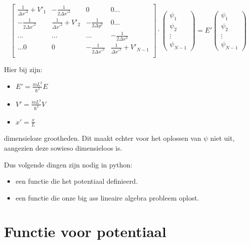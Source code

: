 \documentclass[11pt]{article}
\providecommand{\tightlist}{%
      \setlength{\itemsep}{0pt}\setlength{\parskip}{0pt}}
\begin{document}
\[
\begin{bmatrix}
\frac{1}{\Delta x'^2}+V'_1 & -\frac{1}{2 \Delta x'^2} &   0 & 0...\\
-\frac{1}{2 \Delta x'^2} & \frac{1}{\Delta x'^2}+V'_2 & -\frac{1}{2 \Delta y^2} & 0... \\
...& ... & ... & -\frac{1}{2 \Delta x^2}\\
...0 & 0 & -\frac{1}{2 \Delta x'^2} & \frac{1}{\Delta x'^2}+V'_{N-1}\\
\end{bmatrix} \cdot \begin{pmatrix}
\psi_1\\
\psi_2\\
\vdots\\
\psi_{N-1}
\end{pmatrix} = E' \begin{pmatrix}
\psi_1\\
\psi_2\\
\vdots\\
\psi_{N-1}
\end{pmatrix}
\]

Hier bij zijn:

\begin{itemize}
\tightlist
\item
  \(E' = \frac{m L^2}{\hbar^2} E\)
\item
  \(V' = \frac{m L^2}{\hbar^2} V\)
\item
  \(x' = \frac{x}{L}\)
\end{itemize}

dimensieloze grootheden. Dit maakt echter voor het oplossen van \(\psi\)
niet uit, aangezien deze sowieso dimensieloos is.

Dus volgende dingen zijn nodig in python:

\begin{itemize}
\tightlist
\item
  een functie die het potentiaal definieerd.
\item
  een functie die onze big ass lineaire algebra probleem oplost.
\end{itemize}

    \hypertarget{functie-voor-potentiaal}{%
\section{Functie voor potentiaal}\label{functie-voor-potentiaal}}
\end{document}
